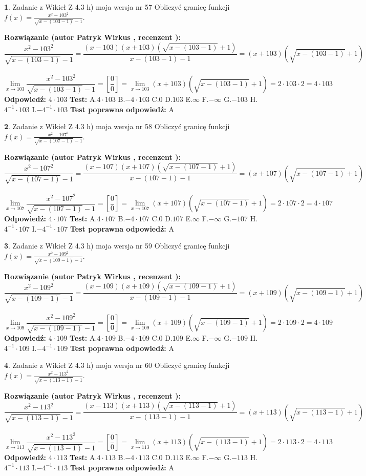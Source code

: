 \documentclass[12pt, a4paper]{article}
\theoremstyle{definition} %
\newtheorem{zad}{}
\newcommand{\zadStart}[1]{\begin{zad}#1\newline}
\newcommand{\zadStop}{\end{zad}}
\newcommand{\rozwStart}[2]{\noindent \textbf{Rozwiązanie (autor #1 , recenzent #2): }\newline}
\newcommand{\rozwStop}{\newline}
\newcommand{\odpStart}{\noindent \textbf{Odpowiedź:}\newline}
\newcommand{\odpStop}{\newline}
\newcommand{\testStart}{\noindent \textbf{Test:}\newline}
\newcommand{\testStop}{\newline}
\newcommand{\kluczStart}{\noindent \textbf{Test poprawna odpowiedź:}\newline}
\newcommand{\kluczStop}{\newline}
\begin{document}
\zadStart{Zadanie z Wikieł Z 4.3 h) moja wersja nr 57}
Obliczyć granicę funkcji $f(x)=\frac{x^{2} - 103^{2}}{\sqrt{x-(103-1)}-1}$.
\zadStop
\rozwStart{Patryk Wirkus}{}
$$\frac{x^{2} - 103^{2}}{\sqrt{x-(103-1)}-1}=\frac{(x-103)(x+103)(\sqrt{x-(103-1)}+1)}{x-(103-1)-1}=(x+103)(\sqrt{x-(103-1)}+1)$$
\\
$$\lim\limits_{x\to 103}\frac{x^{2} - 103^{2}}{\sqrt{x-(103-1)}-1}=[\frac{0}{0}]=
\lim\limits_{x\to 103}(x+103)(\sqrt{x-(103-1)}+1) = 2\cdot103 \cdot 2 = 4 \cdot 103$$
\rozwStop
\odpStart
$4\cdot103$
\odpStop
\testStart
A.$4\cdot103$
B.$-4\cdot103$
C.$0$
D.$103$
E.$\infty$
F.$-\infty$
G.$-103$
H.$4^{-1}\cdot103$
I.$-4^{-1}\cdot103$
\testStop
\kluczStart
A
\kluczStop



\zadStart{Zadanie z Wikieł Z 4.3 h) moja wersja nr 58}
Obliczyć granicę funkcji $f(x)=\frac{x^{2} - 107^{2}}{\sqrt{x-(107-1)}-1}$.
\zadStop
\rozwStart{Patryk Wirkus}{}
$$\frac{x^{2} - 107^{2}}{\sqrt{x-(107-1)}-1}=\frac{(x-107)(x+107)(\sqrt{x-(107-1)}+1)}{x-(107-1)-1}=(x+107)(\sqrt{x-(107-1)}+1)$$
\\
$$\lim\limits_{x\to 107}\frac{x^{2} - 107^{2}}{\sqrt{x-(107-1)}-1}=[\frac{0}{0}]=
\lim\limits_{x\to 107}(x+107)(\sqrt{x-(107-1)}+1) = 2\cdot107 \cdot 2 = 4 \cdot 107$$
\rozwStop
\odpStart
$4\cdot107$
\odpStop
\testStart
A.$4\cdot107$
B.$-4\cdot107$
C.$0$
D.$107$
E.$\infty$
F.$-\infty$
G.$-107$
H.$4^{-1}\cdot107$
I.$-4^{-1}\cdot107$
\testStop
\kluczStart
A
\kluczStop



\zadStart{Zadanie z Wikieł Z 4.3 h) moja wersja nr 59}
Obliczyć granicę funkcji $f(x)=\frac{x^{2} - 109^{2}}{\sqrt{x-(109-1)}-1}$.
\zadStop
\rozwStart{Patryk Wirkus}{}
$$\frac{x^{2} - 109^{2}}{\sqrt{x-(109-1)}-1}=\frac{(x-109)(x+109)(\sqrt{x-(109-1)}+1)}{x-(109-1)-1}=(x+109)(\sqrt{x-(109-1)}+1)$$
\\
$$\lim\limits_{x\to 109}\frac{x^{2} - 109^{2}}{\sqrt{x-(109-1)}-1}=[\frac{0}{0}]=
\lim\limits_{x\to 109}(x+109)(\sqrt{x-(109-1)}+1) = 2\cdot109 \cdot 2 = 4 \cdot 109$$
\rozwStop
\odpStart
$4\cdot109$
\odpStop
\testStart
A.$4\cdot109$
B.$-4\cdot109$
C.$0$
D.$109$
E.$\infty$
F.$-\infty$
G.$-109$
H.$4^{-1}\cdot109$
I.$-4^{-1}\cdot109$
\testStop
\kluczStart
A
\kluczStop



\zadStart{Zadanie z Wikieł Z 4.3 h) moja wersja nr 60}
Obliczyć granicę funkcji $f(x)=\frac{x^{2} - 113^{2}}{\sqrt{x-(113-1)}-1}$.
\zadStop
\rozwStart{Patryk Wirkus}{}
$$\frac{x^{2} - 113^{2}}{\sqrt{x-(113-1)}-1}=\frac{(x-113)(x+113)(\sqrt{x-(113-1)}+1)}{x-(113-1)-1}=(x+113)(\sqrt{x-(113-1)}+1)$$
\\
$$\lim\limits_{x\to 113}\frac{x^{2} - 113^{2}}{\sqrt{x-(113-1)}-1}=[\frac{0}{0}]=
\lim\limits_{x\to 113}(x+113)(\sqrt{x-(113-1)}+1) = 2\cdot113 \cdot 2 = 4 \cdot 113$$
\rozwStop
\odpStart
$4\cdot113$
\odpStop
\testStart
A.$4\cdot113$
B.$-4\cdot113$
C.$0$
D.$113$
E.$\infty$
F.$-\infty$
G.$-113$
H.$4^{-1}\cdot113$
I.$-4^{-1}\cdot113$
\testStop
\kluczStart
A
\kluczStop
\end{document}
